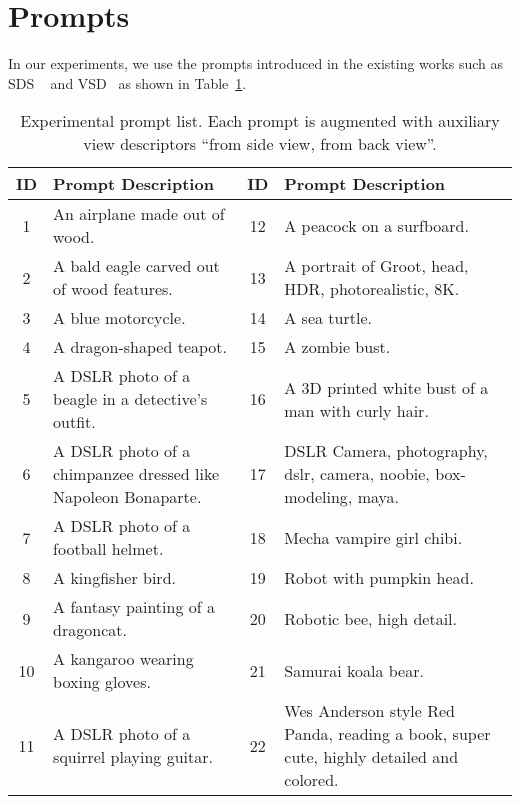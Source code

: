 
\section{Prompts}\label{app:prompt}
In our experiments, we use the prompts introduced in the existing works such as SDS ~\citep{poole2022dreamfusion} and VSD~\citep{wang2024prolificdreamer} as shown in Table~\ref{tab:promptlist}.



\begin{table}[htbp]
    \centering
    \caption{Experimental prompt list. Each prompt is augmented with auxiliary view descriptors ``from side view, from back view''.}
    \begin{tabular}{|c|p{5.5cm}|c|p{5.5cm}|}
    \hline
    \textbf{ID} & \textbf{Prompt Description} & \textbf{ID} & \textbf{Prompt Description} \\ \hline
    1 & An airplane made out of wood. & 12 & A peacock on a surfboard. \\ \hline
    2 & A bald eagle carved out of wood features. & 13 & A portrait of Groot, head, HDR, photorealistic, 8K. \\ \hline
    3 & A blue motorcycle. & 14 & A sea turtle. \\ \hline
    4 & A dragon-shaped teapot. & 15 & A zombie bust. \\ \hline
    5 & A DSLR photo of a beagle in a detective's outfit. & 16 & A 3D printed white bust of a man with curly hair. \\ \hline
    6 & A DSLR photo of a chimpanzee dressed like Napoleon Bonaparte. & 17 & DSLR Camera, photography, dslr, camera, noobie, box-modeling, maya. \\ \hline
    7 & A DSLR photo of a football helmet. & 18 & Mecha vampire girl chibi. \\ \hline
    8 & A kingfisher bird. & 19 & Robot with pumpkin head. \\ \hline
    9 & A fantasy painting of a dragoncat. & 20 & Robotic bee, high detail. \\ \hline
    10 & A kangaroo wearing boxing gloves. & 21 & Samurai koala bear. \\ \hline
    11 & A DSLR photo of a squirrel playing guitar. & 22 & Wes Anderson style Red Panda, reading a book, super cute, highly detailed and colored. \\ \hline
    \end{tabular}
    \label{tab:promptlist}
\end{table}




\clearpage